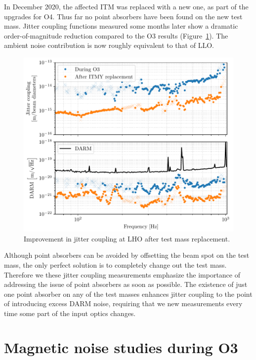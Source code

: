 In December 2020, the affected ITM was replaced with a new one, as part of the upgrades for \ac{O4}.
Thus far no point absorbers have been found on the new test mass.
Jitter coupling functions measured some months later show a dramatic order-of-magnitude reduction compared to the O3 results (Figure~\ref{fig:vib-jitter}).
The ambient noise contribution is now roughly equivalent to that of LLO.

\begin{figure}[htb]
	\centering
	\includegraphics{figures/noise-studies/noise-jitter.pdf}
	\caption{Improvement in jitter coupling at LHO after test mass replacement.}
	\label{fig:vib-jitter}
\end{figure}

Although point absorbers can be avoided by offsetting the beam spot on the test mass, the only perfect solution is to completely change out the test mass.
Therefore we these jitter coupling measurements emphasize the importance of addressing the issue of point absorbers as soon as possible.
The existence of just one point absorber on any of the test masses enhances jitter coupling to the point of introducing excess DARM noise, requiring that we new measurements every time some part of the input optics changes.

\section{Magnetic noise studies during O3}\label{sec:mag}

